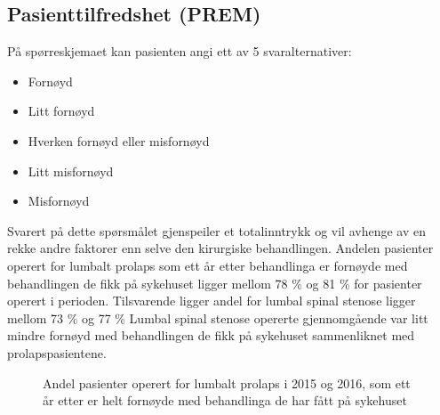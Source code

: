 \documentclass [norsk,a4paper,twoside]{article}\usepackage[]{graphicx}\usepackage[]{color}
\begin{document}
\subsection{Pasienttilfredshet (PREM)}

På spørreskjemaet kan pasienten angi ett av 5 svaralternativer:
      \begin{itemize}
\item Fornøyd
\item Litt fornøyd
\item Hverken fornøyd eller misfornøyd
\item Litt misfornøyd
\item Misfornøyd
\end{itemize} 

 
Svarert på dette spørsmålet gjenspeiler et totalinntrykk og vil avhenge av en rekke andre faktorer enn selve den kirurgiske behandlingen. Andelen pasienter operert for lumbalt prolaps som ett år etter behandlinga er fornøyde med behandlingen de fikk på sykehuset  
ligger mellom 78 \% og 81 \% 
      for pasienter operert i perioden. 
Tilsvarende ligger andel for lumbal spinal stenose ligger mellom 73 \% 
og 77 \%
Lumbal spinal stenose opererte gjennomgående var litt mindre fornøyd med behandlingen de fikk på sykehuset sammenliknet med prolapspasientene.





      

\begin{figure}[h] 
\caption{Andel pasienter operert for lumbalt prolaps i 2015 og 2016, som ett år etter er helt fornøyde med behandlinga de har fått på sykehuset}
\label{fig:FornoydAvdPro}
\end{figure}
\end{document}
